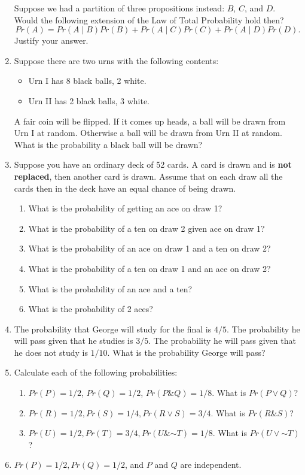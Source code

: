\documentclass[justified]{tufte-book}
\providecommand{\tightlist}{%
  \setlength{\itemsep}{0pt}\setlength{\parskip}{0pt}}
\newcommand{\given}{\mid}
\renewcommand{\neg}{\mathbin{\sim}}
\renewcommand{\wedge}{\mathbin{\&}}
\newcommand{\p}{Pr}
\theoremstyle{definition}
\theoremstyle{definition}
\theoremstyle{definition}
\theoremstyle{remark}
\begin{document}
\begin{enumerate}
  Suppose we had a partition of three propositions instead: \(B\),
  \(C\), and \(D\). Would the following extension of the Law of Total
  Probability hold then?
  \[\p(A) = \p(A \given B)\p(B) + \p(A \given C)\p(C) + \p(A \given D)\p(D).\]
  Justify your answer.
\item
  Suppose there are two urns with the following contents:

  \begin{itemize}
  \tightlist
  \item
    Urn I has 8 black balls, 2 white.
  \item
    Urn II has 2 black balls, 3 white.
  \end{itemize}

  A fair coin will be flipped. If it comes up heads, a ball will be
  drawn from Urn I at random. Otherwise a ball will be drawn from Urn II
  at random. What is the probability a black ball will be drawn?
\item
  Suppose you have an ordinary deck of 52 cards. A card is drawn and is
  \textbf{not replaced}, then another card is drawn. Assume that on each
  draw all the cards then in the deck have an equal chance of being
  drawn.

  \begin{enumerate}
  \def\labelenumii{\alph{enumii}.}
  \tightlist
  \item
    What is the probability of getting an ace on draw 1?
  \item
    What is the probability of a ten on draw 2 given ace on draw 1?
  \item
    What is the probability of an ace on draw 1 and a ten on draw 2?
  \item
    What is the probability of a ten on draw 1 and an ace on draw 2?
  \item
    What is the probability of an ace and a ten?
  \item
    What is the probability of 2 aces?
  \end{enumerate}
\item
  The probability that George will study for the final is \(4/5\). The
  probability he will pass given that he studies is \(3/5\). The
  probability he will pass given that he does not study is \(1/10\).
  What is the probability George will pass?
\item
  Calculate each of the following probabilities:

  \begin{enumerate}
  \def\labelenumii{\alph{enumii}.}
  \tightlist
  \item
    \(Pr(P) = 1/2\), \(Pr(Q) = 1/2\), \(Pr(P \wedge Q) = 1/8\). What is
    \(Pr(P \vee Q)\)?
  \item
    \(Pr(R) = 1/2, Pr(S) = 1/4, Pr(R \vee S) = 3/4\). What is
    \(Pr(R \wedge S)\)?
  \item
    \(Pr(U) = 1/2, Pr(T) = 3/4, Pr(U \wedge \neg T) = 1/8\). What is
    \(Pr(U \vee \neg T)\)?
  \end{enumerate}
\item
  \(Pr(P) = 1/2, Pr(Q) = 1/2\), and \(P\) and \(Q\) are independent.


\end{enumerate}
\end{document}
